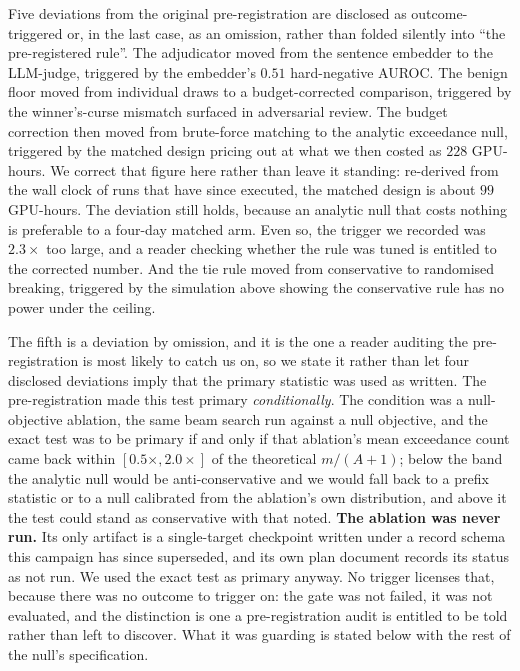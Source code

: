 Five deviations from the original pre-registration are disclosed as outcome-triggered or,
in the last case, as an omission, rather than folded silently into ``the pre-registered
rule''. The adjudicator moved from the
sentence embedder to the LLM-judge, triggered by the embedder's $0.51$ hard-negative AUROC.
The benign floor moved from individual draws to a budget-corrected comparison, triggered by
the winner's-curse mismatch surfaced in adversarial review. The budget correction then moved
from brute-force matching to the analytic exceedance null, triggered by the matched design
pricing out at what we then costed as $228$ GPU-hours. We correct that figure here rather than
leave it standing: re-derived from the wall clock of runs that have since executed, the matched
design is about $99$ GPU-hours. The deviation still holds, because an analytic null that costs
nothing is preferable to a four-day matched arm. Even so, the trigger we recorded was
$2.3\times$ too large, and a reader checking whether the rule was tuned is entitled to the
corrected number. And the tie rule moved from
conservative to randomised
breaking, triggered by the simulation above showing the conservative rule has no power under
the ceiling.

The fifth is a deviation by omission, and it is the one a reader auditing the
pre-registration is most likely to catch us on, so we state it rather than let four disclosed
deviations imply that the primary statistic was used as written. The pre-registration made
this test primary \emph{conditionally}. The condition was a null-objective ablation, the same
beam search run against a null objective, and the exact test was to be primary if and only if
that ablation's mean exceedance count came back within $[0.5\times, 2.0\times]$ of the
theoretical $m/(A{+}1)$; below the band the analytic null would be anti-conservative and we
would fall back to a prefix statistic or to a null calibrated from the ablation's own
distribution, and above it the test could stand as conservative with that noted. \textbf{The
ablation was never run.} Its only artifact is a single-target checkpoint written under a
record schema this campaign has since superseded, and its own plan document records its
status as not run. We used the exact test as primary anyway. No trigger licenses that, because
there was no outcome to trigger on: the gate was not failed, it was not evaluated, and the
distinction is one a pre-registration audit is entitled to be told rather than left to
discover. What it was guarding is stated below with the rest of the null's specification.

